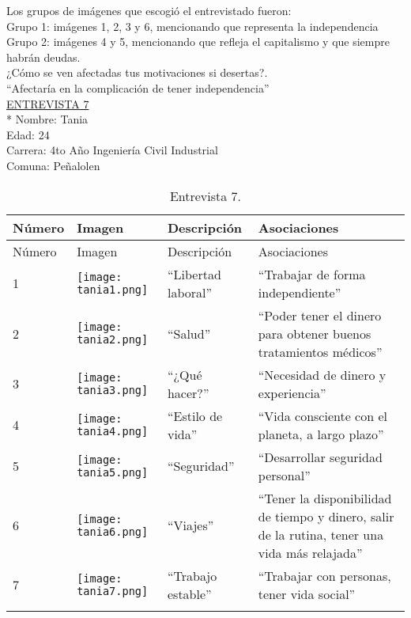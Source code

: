 Los grupos de imágenes que escogió el entrevistado fueron:\\

Grupo 1: imágenes 1, 2, 3 y 6, mencionando que representa la independencia \\

Grupo 2: imágenes 4 y 5, mencionando que refleja el capitalismo y que siempre habrán deudas.\\


¿Cómo se ven afectadas tus motivaciones si desertas?.\\

``Afectaría en la complicación de tener independencia''\\


\underline {ENTREVISTA 7}\\*
Nombre: Tania \\
Edad: 24\\
Carrera: 4to Año Ingeniería Civil Industrial \\
Comuna: Peñalolen \\

\begin{longtable}{>{\centering\arraybackslash}m{1cm} >{\centering\arraybackslash}m{2cm} >{\arraybackslash}m{5cm}>{\arraybackslash}m{5cm}}
	
	\hline
	Número & Imagen & Descripción & Asociaciones \\
	\hline \hline
	\endfirsthead
	
	\hline
	Número & Imagen & Descripción & Asociaciones \\
	\hline \hline
	\endhead

1 & \texttt{[image: tania1.png]} & ``Libertad laboral'' & ``Trabajar de forma independiente'' \\
\hline

2 & \texttt{[image: tania2.png]} & ``Salud'' & ``Poder tener el dinero para obtener buenos tratamientos médicos'' \\
\hline

3 & \texttt{[image: tania3.png]} & ``¿Qué hacer?'' & ``Necesidad de dinero y experiencia'' \\
\hline

4 & \texttt{[image: tania4.png]} & ``Estilo de vida'' & ``Vida consciente con el planeta, a largo plazo'' \\
\hline

5 & \texttt{[image: tania5.png]} & ``Seguridad'' & ``Desarrollar seguridad personal'' \\
\hline

6 & \texttt{[image: tania6.png]} & ``Viajes'' & ``Tener la disponibilidad de tiempo y dinero, salir de la rutina, tener una vida más relajada''\\
\hline

7 & \texttt{[image: tania7.png]} & ``Trabajo estable'' & ``Trabajar con personas, tener vida social''\\
\hline

\caption{Entrevista 7.}
\label{tabla:tania}
\end{longtable}

